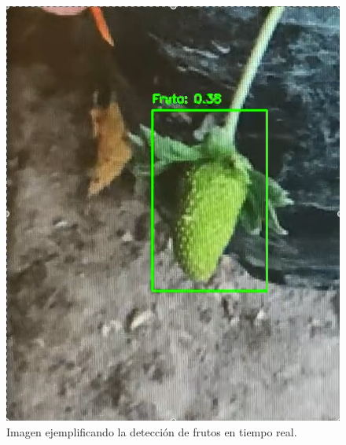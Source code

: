 \documentclass[conference]{IEEEtran}
\begin{document}
\begin{figure}[ht]
    \centering
    \includegraphics[width=\columnwidth]{images/detection.png}
    \caption{Imagen ejemplificando la detección de frutos en tiempo real.}
    \label{fig:detection}
\end{figure}
\end{document}
